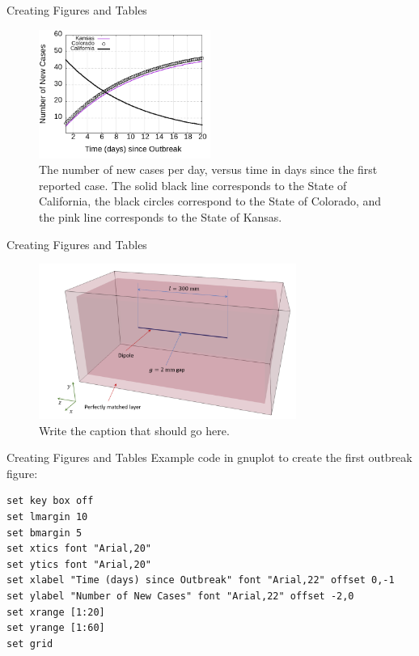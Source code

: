\documentclass{beamer}
\begin{document}
\begin{frame}{Creating Figures and Tables}
\small
\begin{figure}
\includegraphics[width=0.5\textwidth]{figures/outbreak3.png}
\caption{\label{fig:outbreak4} The number of new cases per day, versus time in days since the first reported case.  The solid black line corresponds to the State of California, the black circles correspond to the State of Colorado, and the pink line corresponds to the State of Kansas.}
\end{figure}
\end{frame}

\begin{frame}{Creating Figures and Tables}
\small
\begin{figure}
\includegraphics[width=0.75\textwidth]{figures/dipole.png}
\caption{\label{fig:outbreak5} Write the caption that should go here.}
\end{figure}
\end{frame}

\begin{frame}[fragile]{Creating Figures and Tables}
\small
Example code in gnuplot to create the first outbreak figure:
\begin{verbatim}
set key box off
set lmargin 10
set bmargin 5
set xtics font "Arial,20"
set ytics font "Arial,20"
set xlabel "Time (days) since Outbreak" font "Arial,22" offset 0,-1
set ylabel "Number of New Cases" font "Arial,22" offset -2,0
set xrange [1:20]
set yrange [1:60]
set grid
\end{verbatim}
\end{frame}
\end{document}
